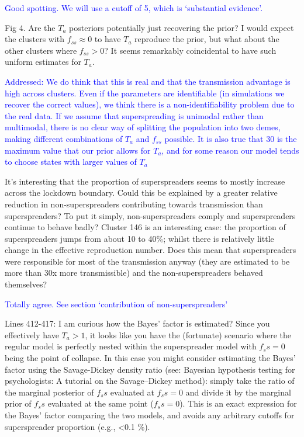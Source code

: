 \documentclass[pdflatex,sn-nature]{sn-jnl}%
\begin{document}
\textcolor{blue}{Good spotting. We will use a cutoff of 5, which is `substantial evidence'.}

Fig 4. Are the $T_a$ posteriors potentially just recovering the prior? I would expect the clusters with $f_{ss} \approx 0$ to have $T_a$ reproduce the prior, but what about the other clusters where $f_{ss} > 0$? It seems remarkably coincidental to have such uniform estimates for $T_a$.

\textcolor{blue}{Addressed: We do think that this is real and that the transmission advantage is high across clusters. Even if the parameters are identifiable (in simulations we recover the correct values), we think there is a non-identifiability problem due to the real data. If we assume that superspreading is unimodal rather than multimodal, there is no clear way of splitting the population into two demes, making different combinations of $T_a$ and $f_{ss}$ possible. It is also true that 30 is the maximum value that our prior allows for $T_a$, and for some reason our model tends to choose states with larger values of $T_a$}

It's interesting that the proportion of superspreaders seems to mostly increase across the lockdown boundary. Could this be explained by a greater relative reduction in non-superspreaders contributing towards transmission than superspreaders? To put it simply, non-superspreaders comply and superspreaders continue to behave badly? Cluster 146 is an interesting case: the proportion of superspreaders jumps from about 10 to 40\%; whilst there is relatively little change in the effective reproduction number. Does this mean that superspreaders were responsible for most of the transmission anyway (they are estimated to be more than 30x more transmissible) and the non-superspreaders behaved themselves?

\textcolor{blue}{Totally agree. See section `contribution of non-superspreaders'}

Lines 412-417: I am curious how the Bayes' factor is estimated? Since you effectively have $T_a > 1$, it looks like you have the (fortunate) scenario where the regular model is perfectly nested within the superspreader model with $f_ss = 0$ being the point of collapse. In this case you might consider estimating the Bayes' factor using the Savage-Dickey density ratio (see: Bayesian hypothesis testing for psychologists: A tutorial on the Savage–Dickey method): simply take the ratio of the marginal posterior of $f_ss$ evaluated at $f_ss = 0$ and divide it by the marginal prior of $f_ss$ evaluated at the same point ($f_ss = 0$). This is an exact expression for the Bayes' factor comparing the two models, and avoids any arbitrary cutoffs for superspreader proportion (e.g., <0.1 \%).
\end{document}
